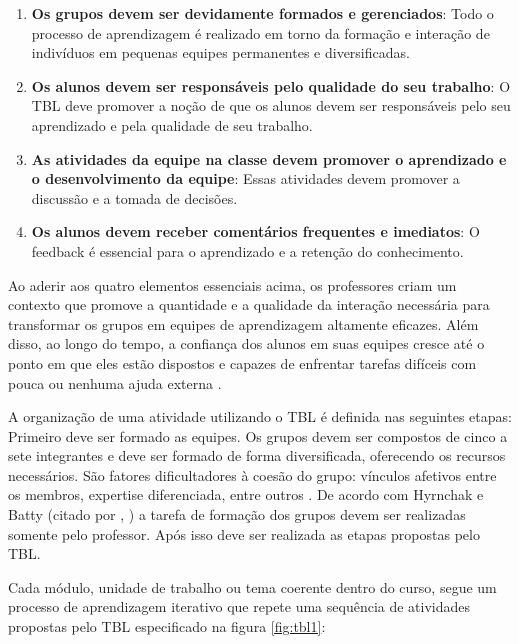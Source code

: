 \begin{enumerate}
  \item \textbf{Os grupos devem ser devidamente formados e gerenciados}: Todo o processo de aprendizagem é realizado em torno da formação e interação de indivíduos em pequenas equipes permanentes e diversificadas.
  \item \textbf{Os alunos devem ser responsáveis pelo qualidade do seu trabalho}: O TBL deve promover a noção de que os alunos devem ser responsáveis pelo seu aprendizado e pela qualidade de seu trabalho.
  \item \textbf{As atividades da equipe na classe devem promover o aprendizado e o desenvolvimento da equipe}: Essas atividades devem promover a discussão e a tomada de decisões.
  \item \textbf{Os alunos devem receber comentários frequentes e imediatos}: O feedback é essencial para o aprendizado e a retenção do conhecimento.
\end{enumerate}

Ao aderir aos quatro elementos essenciais acima, os professores criam um contexto que promove a quantidade e a qualidade da interação necessária para transformar os grupos em equipes de aprendizagem altamente eficazes. Além disso, ao longo do tempo, a confiança dos alunos em suas equipes cresce até o ponto em que eles estão dispostos e capazes de enfrentar tarefas difíceis com pouca ou nenhuma ajuda externa \cite{sweet}.

A organização de uma atividade utilizando o TBL é definida nas seguintes etapas: Primeiro deve ser formado as equipes.  Os grupos devem ser compostos de cinco a sete integrantes e deve ser formado de forma diversificada, oferecendo os recursos necessários. São fatores dificultadores à coesão do grupo: vínculos afetivos entre os membros, expertise diferenciada, entre outros \cite{bollela}. De acordo com Hyrnchak e Batty (citado por \citeauthor{bollela}, \citeyear{bollela}) a tarefa de formação dos grupos devem ser realizadas somente pelo professor. Após isso deve ser realizada as etapas propostas pelo TBL.

Cada módulo, unidade de trabalho ou tema coerente dentro do curso, segue um processo de aprendizagem iterativo que repete uma sequência de atividades propostas pelo TBL especificado na figura \ref{fig:tbl1}:

